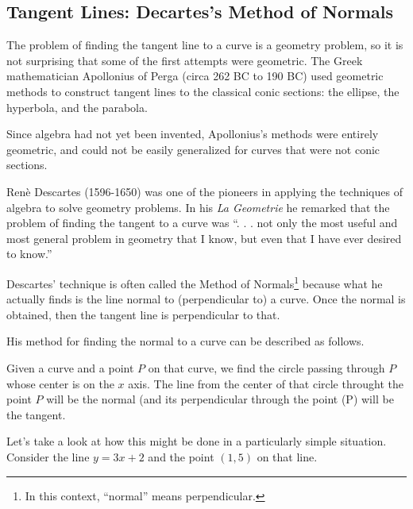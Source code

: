 \subsection{Tangent Lines: Decartes's Method of
    Normals}

\label{sec:descartes-normals}

  The problem of finding the tangent line to a curve is a geometry
  problem, so it is not surprising that some of the first attempts
  were geometric. The Greek mathematician Apollonius of Perga (circa
  262 BC to 190 BC) used geometric methods to construct tangent lines to
  the classical conic sections: the ellipse, the hyperbola, and the
  parabola.


  Since algebra had not yet been invented, Apollonius's methods were
  entirely geometric, and could not be easily generalized for curves
  that were not conic sections. 


Ren\`e{} Descartes (1596-1650)  was one of the pioneers in applying the
techniques of algebra to solve geometry problems.  In his \emph{La
  Geometrie} he remarked that the problem of finding the tangent to a
curve was ``. . .  not only the most useful and most general problem
in geometry that I know, but even that I have ever desired to know.''

Descartes' technique is often called the Method of Normals\footnote{In this context, ``normal'' means
      perpendicular.} because
what he actually finds is the line normal to (perpendicular to) a
curve.  Once the normal is obtained, then the tangent line is
perpendicular to that.

His method for finding the normal to a curve can be described as
follows.

Given a curve and a point $P$ on that curve, we find the circle
passing through $P$ whose center is on the $x$ axis. The line from the
center of that circle throught the point $P$ will be the normal (and
its perpendicular through the point (P) will be the tangent.

Let's take a look at how this might be done in a particularly simple
situation. Consider the line $y=3x+2$ and the point $(1,5)$ on that
line.

